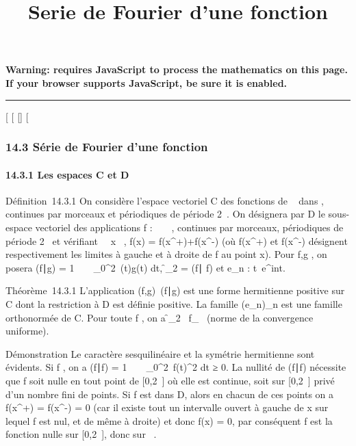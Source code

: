 \documentclass[]{article}
\title{Serie de Fourier d'une fonction}
\author{}
\date{}
\begin{document}
\maketitle

\textbf{Warning: 
requires JavaScript to process the mathematics on this page.\\ If your
browser supports JavaScript, be sure it is enabled.}

\begin{center}\rule{3in}{0.4pt}\end{center}

{[}
{[}
{[}{]}
{[}

\subsubsection{14.3 Série de Fourier d'une fonction}

\paragraph{14.3.1 Les espaces C et D}

Définition~14.3.1 On considère l'espace vectoriel C des fonctions de ~
dans , continues par morceaux et périodiques de période 2\pi~. On
désignera par D le sous-espace vectoriel des applications f : ~ \rightarrow~ ,
continues par morceaux, périodiques de période 2\pi~ et vérifiant
\forall~~x \in {}~, f(x) =
f(x^+)+f(x^-)  (où
f(x^+) et f(x^-) désignent respectivement les
limites à gauche et à droite de f au point x). Pour f,g \inC, on posera
(f∣g) = 1 \pi~
\int ~
_0^2\pi~\overlinef(t)g(t) dt,
\f_2 =
\sqrt(f∣ f) et
e_n : t\mapsto~e^int.

Théorème~14.3.1 L'application
(f,g)\mapsto~(f\mathrel∣g) est
une forme hermitienne positive sur C dont la restriction à D est définie
positive. La famille (e_n)_n\in{} est une famille
orthonormée de C. Pour toute f \inC, on a
\f_2
\leq\ f_\infty~
(norme de la convergence uniforme).

Démonstration Le caractère sesquilinéaire et la symétrie hermitienne
sont évidents. Si f \inC, on a (f∣f) = 1
\pi~ \int ~
_0^2\pi~f(t)^2 dt ≥ 0. La
nullité de (f∣f) nécessite que f soit nulle
en tout point de {[}0,2\pi~{]} où elle est continue, soit sur {[}0,2\pi~{]}
privé d'un nombre fini de points. Si f est dans D, alors en chacun de
ces points on a f(x^+) = f(x^-) = 0 (car il existe
tout un intervalle ouvert à gauche de x sur lequel f est nul, et de même
à droite) et donc f(x) = 0, par conséquent f est la fonction nulle sur
{[}0,2\pi~{]}, donc sur ~.
\end{document}
